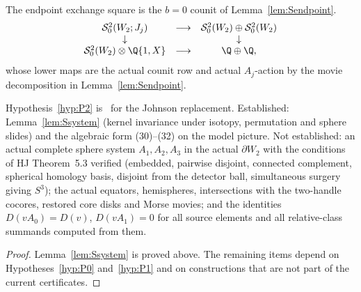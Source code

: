 The endpoint exchange square is the $b=0$ counit of
Lemma~\ref{lem:Sendpoint}.
\[
\begin{array}{ccc}
\mathcal S^2_0(W_2;J_j)&\longrightarrow&
\mathcal S^2_0(W_2)\oplus\mathcal S^2_0(W_2)\\
\downarrow&&\downarrow\\
\mathcal S^2_0(W_2)\otimes\Q\{1,X\}&\longrightarrow&\Q\oplus\Q,
\end{array}
\]
whose lower maps are the actual counit row and actual \(A_j\)-action by the
movie decomposition in Lemma~\ref{lem:Sendpoint}.

\begin{proposition}[Status of S]\label{thm:Sdischarge}
Hypothesis~\ref{hyp:P2} is \Open\ for the Johnson replacement.
Established: Lemma~\ref{lem:Ssystem} (kernel invariance under isotopy,
permutation and sphere slides) and the algebraic form (30)--(32) on the
model picture.  Not established: an actual complete sphere system
$A_1,A_2,A_3$ in the actual $\partial W_2$ with the conditions of HJ
Theorem~5.3 verified (embedded, pairwise disjoint, connected complement,
spherical homology basis, disjoint from the detector ball, simultaneous
surgery giving $S^3$); the actual equators, hemispheres, intersections with
the two-handle cocores, restored core disks and Morse movies; and the
identities $D(vA_0)=D(v)$, $D(vA_1)=0$ for all source elements and all
relative-class summands computed from them.
\end{proposition}

\begin{proof}
Lemma~\ref{lem:Ssystem} is proved above.  The remaining items depend on
Hypotheses~\ref{hyp:P0} and~\ref{hyp:P1} and on constructions that are not
part of the current certificates.
\end{proof}
